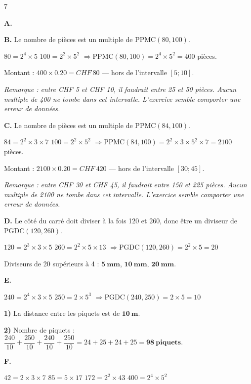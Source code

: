 \begin{solution}{7}

\textbf{A.} 

\bigskip
\textbf{B.} Le nombre de pièces est un multiple de $\text{PPMC}(80, 100)$.

$80 = 2^4 \times 5$ \quad $100 = 2^2 \times 5^2$ \quad $\Rightarrow \text{PPMC}(80,100) = 2^4 \times 5^2 = 400$ pièces.

Montant : $400 \times 0.20 = CHF\ 80$ — hors de l'intervalle $[5; 10]$.

\medskip
\textit{Remarque : entre CHF 5 et CHF 10, il faudrait entre 25 et 50 pièces. Aucun multiple de 400 ne tombe dans cet intervalle. L'exercice semble comporter une erreur de données.}

\bigskip
\textbf{C.} Le nombre de pièces est un multiple de $\text{PPMC}(84, 100)$.

$84 = 2^2 \times 3 \times 7$ \quad $100 = 2^2 \times 5^2$ \quad $\Rightarrow \text{PPMC}(84,100) = 2^2 \times 3 \times 5^2 \times 7 = 2100$ pièces.

Montant : $2100 \times 0.20 = CHF\ 420$ — hors de l'intervalle $[30; 45]$.

\medskip
\textit{Remarque : entre CHF 30 et CHF 45, il faudrait entre 150 et 225 pièces. Aucun multiple de 2100 ne tombe dans cet intervalle. L'exercice semble comporter une erreur de données.}

\bigskip
\textbf{D.} Le côté du carré doit diviser à la fois 120 et 260, donc être un diviseur de $\text{PGDC}(120, 260)$.

$120 = 2^3 \times 3 \times 5$ \quad $260 = 2^2 \times 5 \times 13$ \quad $\Rightarrow \text{PGDC}(120,260) = 2^2 \times 5 = 20$

Diviseurs de 20 supérieurs à 4 : $\mathbf{5\ mm}$, $\mathbf{10\ mm}$, $\mathbf{20\ mm}$.

\bigskip
\textbf{E.}

$240 = 2^4 \times 3 \times 5$ \quad $250 = 2 \times 5^3$ \quad $\Rightarrow \text{PGDC}(240,250) = 2 \times 5 = 10$

\textbf{1)} La distance entre les piquets est de $\mathbf{10\ m}$.

\textbf{2)} Nombre de piquets : $\dfrac{240}{10} + \dfrac{250}{10} + \dfrac{240}{10} + \dfrac{250}{10} = 24 + 25 + 24 + 25 = \mathbf{98\ piquets}$.

\bigskip
\textbf{F.}

$42 = 2 \times 3 \times 7$ \quad $85 = 5 \times 17$ \quad $172 = 2^2 \times 43$ \quad $400 = 2^4 \times 5^2$


\end{solution}

